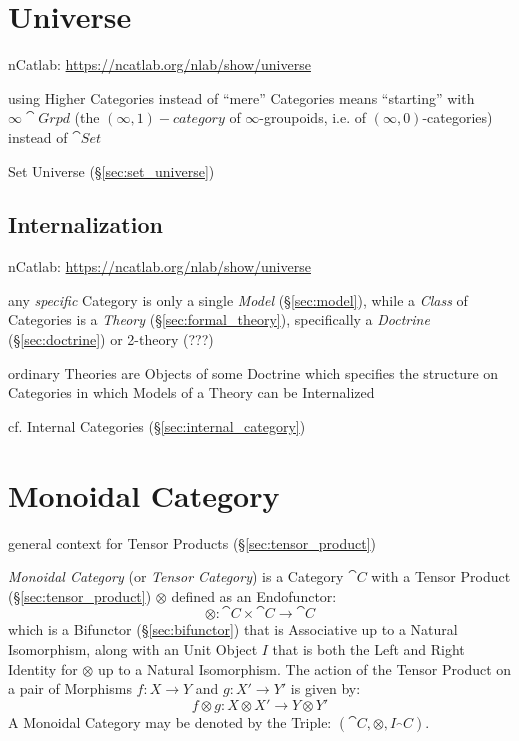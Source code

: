 \section{Universe}\label{sec:category_universe}

nCatlab: \url{https://ncatlab.org/nlab/show/universe}

using Higher Categories instead of ``mere'' Categories means
``starting'' with $\infty\cat{Grpd}$ (the $(\infty,1)-category$ of
$\infty$-groupoids, i.e. of $(\infty,0)$-categories) instead of
$\cat{Set}$

\fist Set Universe (\S\ref{sec:set_universe})




\subsection{Internalization}\label{sec:internalization}

nCatlab: \url{https://ncatlab.org/nlab/show/universe}

any \emph{specific} Category is only a single \emph{Model}
(\S\ref{sec:model}), while a \emph{Class} of Categories is a
\emph{Theory} (\S\ref{sec:formal_theory}), specifically a
\emph{Doctrine} (\S\ref{sec:doctrine}) or 2-theory (???)

ordinary Theories are Objects of some Doctrine which specifies the
structure on Categories in which Models of a Theory can be
Internalized

\fist cf. Internal Categories (\S\ref{sec:internal_category})



\section{Monoidal Category}\label{sec:monoidal_category}

general context for Tensor Products (\S\ref{sec:tensor_product})

\emph{Monoidal Category} (or \emph{Tensor Category}) is a Category
$\cat{C}$ with a Tensor Product (\S\ref{sec:tensor_product})
$\otimes$ defined as an Endofunctor:
\[
  \otimes : \cat{C} \times \cat{C} \rightarrow \cat{C}
\]
which is a Bifunctor (\S\ref{sec:bifunctor}) that is Associative up to
a Natural Isomorphism, along with an Unit Object $I$ that is both the
Left and Right Identity for $\otimes$ up to a Natural Isomorphism. The
action of the Tensor Product on a pair of Morphisms $f : X \rightarrow
Y$ and $g : X' \rightarrow Y'$ is given by:
\[
  f \otimes g : X \otimes X' \rightarrow Y \otimes Y'
\]
A Monoidal Category may be denoted by the Triple: $(\cat{C},
\otimes, I_\cat{C})$.


